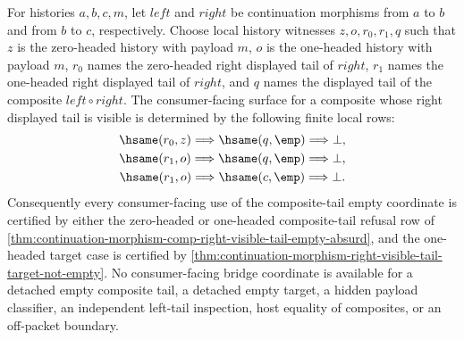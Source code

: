\begin{lemma}
\label{lem:continuation-morphism-comp-right-visible-bridge-determinacy}
For histories $a,b,c,m$, let $left$ and $right$ be continuation morphisms from
$a$ to $b$ and from $b$ to $c$, respectively. Choose local history witnesses
$z,o,r_0,r_1,q$ such that $z$ is the zero-headed history with payload $m$, $o$
is the one-headed history with payload $m$, $r_0$ names the zero-headed right
displayed tail of $right$, $r_1$ names the one-headed right displayed tail of
$right$, and $q$ names the displayed tail of the composite $left\circ right$.
The consumer-facing surface for a composite whose right displayed tail is
visible is determined by the following finite local rows:
$$
\begin{gathered}
\hsame(r_0,z)
\Longrightarrow
\hsame(q,\emp)
\Longrightarrow \bot,\\
\hsame(r_1,o)
\Longrightarrow
\hsame(q,\emp)
\Longrightarrow \bot,\\
\hsame(r_1,o)
\Longrightarrow
\hsame(c,\emp)
\Longrightarrow \bot.
\end{gathered}
$$
Consequently every consumer-facing use of the composite-tail empty coordinate
is certified by either the zero-headed or one-headed composite-tail refusal row
of \autoref{thm:continuation-morphism-comp-right-visible-tail-empty-absurd},
and the one-headed target case is certified by
\autoref{thm:continuation-morphism-right-visible-tail-target-not-empty}. No
consumer-facing bridge coordinate is available for a detached empty composite
tail, a detached empty target, a hidden payload classifier, an independent
left-tail inspection, host equality of composites, or an off-packet boundary.
\end{lemma}
